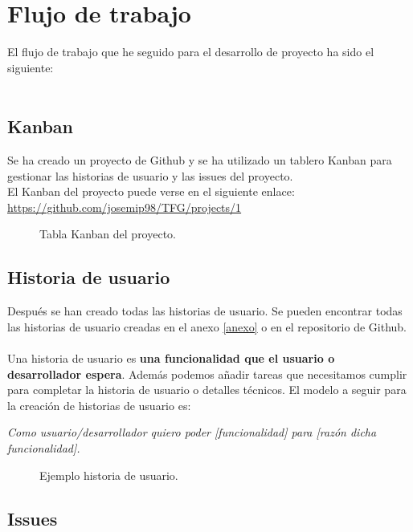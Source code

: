 \section{Flujo de trabajo}

El flujo de trabajo que he seguido para el desarrollo de proyecto ha sido el siguiente:\\\\

\subsection{Kanban}

Se ha creado un proyecto de Github y se ha utilizado un tablero Kanban para gestionar las historias de usuario y las issues del proyecto.\\

El Kanban del proyecto puede verse en el siguiente enlace:
\url{https://github.com/josemip98/TFG/projects/1}

\begin{figure}[H]
  	\centering
  	\noindent{}
  	\caption{Tabla Kanban del proyecto.}
	\end{figure}

\subsection{Historia de usuario}

Después se han creado todas las historias de usuario.
Se pueden encontrar todas las historias de usuario creadas en el anexo \ref{anexo} o en el repositorio de Github\cite{user-stories}.\\\\
Una historia de usuario es \textbf{una funcionalidad que el usuario o desarrollador espera}.
Además podemos añadir tareas que necesitamos cumplir para completar la historia de usuario o detalles técnicos.
El modelo a seguir para la creación de historias de usuario es:
 
\textit{Como usuario/desarrollador quiero poder [funcionalidad] para [razón dicha funcionalidad].}

\begin{figure}[H]
	\centering
	\noindent{}
	\caption{Ejemplo historia de usuario.}
  	\end{figure}

\subsection{Issues}

